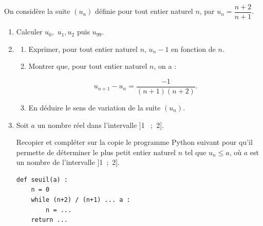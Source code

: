 \medskip

On considère la suite $\left(u_n\right)$ définie pour tout entier naturel $n$, par $u_n = \dfrac{n+2}{n+1}$.

\medskip

\begin{enumerate}
\item Calculer $u_0$,\, $u_1$,\,$u_2$ puis $u_{99}$.
\item 
	\begin{enumerate}
		\item Exprimer, pour tout entier naturel $n$, $u_n - 1$ en fonction de $n$.
		\item Montrer que, pour tout entier naturel $n$, on a :
		
\[u_{n+1} - u_n = \dfrac{- 1}{(n+1)(n+2)}.\]

		\item En déduire le sens de variation de la suite $\left(u_n\right)$.
	\end{enumerate}
\item Soit $a$ un nombre réel dans l'intervalle ]1 ~;~2].

Recopier et compléter sur la copie le programme Python suivant pour qu'il permette de déterminer le plus petit entier naturel $n$ tel que $u_n \leqslant a$, où $a$ est un nombre de l'intervalle ]1~;~2].

\begin{center}
\begin{lstlisting}[style=python]
def seuil(a) :
	n = 0
	while (n+2) / (n+1) ... a : 
		n = ...
	return ... 
\end{lstlisting}
\end{center}
\end{enumerate}
